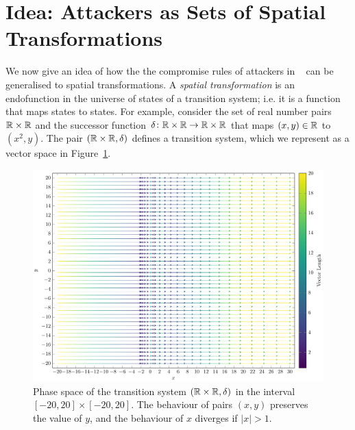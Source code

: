 \section{Idea: Attackers as Sets of Spatial Transformations}
We now give an idea of how the the compromise rules of attackers in ~\cite{KnowYourEnemy} can be generalised to spatial transformations. A \emph{spatial transformation} is an endofunction in the universe of states of a transition system; i.e. it is a function that maps states to states. For example,  consider the set of real number pairs $\mathbb{R}\times\mathbb{R}$ and the successor function $\delta\colon \mathbb{R}\times\mathbb{R}\rightarrow \mathbb{R}\times\mathbb{R}$ that maps $(x,y)\in \mathbb{R}$ to $(x^2,y)$. The pair $(\mathbb{R}\times\mathbb{R}, \delta)$ defines a transition system, which we represent as a vector space in Figure~\ref{fig:IntroVectorSpace}.
\begin{figure}[t]
    \centering
    \includegraphics[width=\textwidth]{Figures/VectorSpace1.pdf} 
    \caption{Phase space of the transition system $(\mathbb{R}\times\mathbb{R}, \delta)$ in the interval $[-20,20]\times[-20,20]$. The behaviour of pairs $(x,y)$ preserves the value of $y$, and the behaviour of $x$ diverges if $|x|>1$.}
    \label{fig:IntroVectorSpace}
  \end{figure}
